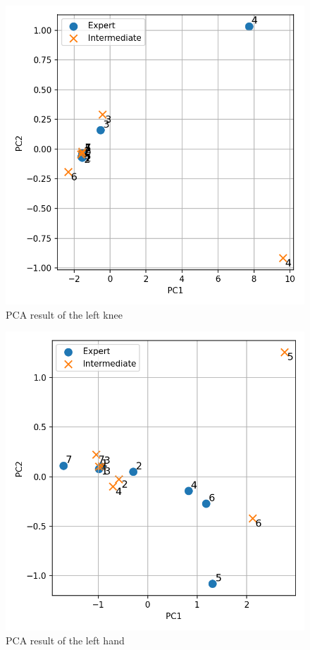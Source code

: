 \documentclass[conference]{IEEEtran}
\begin{document}
%
\begin{figure}[t]
	\centering
	\includegraphics[scale=0.5]{fig/LShin.pdf}
	\caption{PCA result of the left knee}
	\label{fig:LShin}
	\vspace{-0.4cm}
\end{figure}
%

%
\begin{figure}[t]
	\centering
	\includegraphics[scale=0.5]{fig/LHand.pdf}
	\caption{PCA result of the left hand}
	\label{fig:LHand}
	\vspace{-0.4cm}
\end{figure}
%
\end{document}
